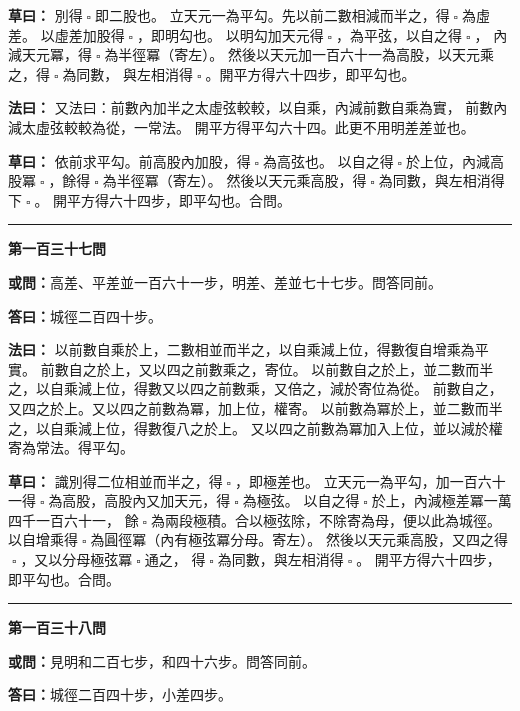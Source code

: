 \documentclass[11pt,a4paper]{article}
\let\origsquare\square
\renewcommand{\square}{\ensuremath{\origsquare}}%
\newcommand{\longline}{\noindent\rule{\textwidth}{0.4pt}}
\newcommand{\owen}[1]{%
  \par\vspace{0.4em}%
  \noindent\textcolor{problemcolor}{\textbf{或問：}}{\tradfont #1}\par\nopagebreak%
}
\newcommand{\fayue}[1]{%
  \par\noindent\textcolor{methodcolor}{\textbf{法曰：}}{\tradfont #1}\par\nopagebreak%
}
\newcommand{\tsaoyue}[1]{%
  \par\noindent\textcolor{workcolor}{\textbf{草曰：}}{\tradfont #1}\par%
}
\newcommand{\dayue}[1]{%
  \par\noindent\textcolor{anscolor}{\textbf{答曰：}}{\tradfont #1}\par\nopagebreak%
}
\newcommand{\wen}[1]{\par\vspace{0.3em}\noindent\textcolor{problemcolor}{\textbf{第#1問}}\par}
\begin{document}
\tsaoyue{%
別得$ \; \square \; $即二股也。
立天元一為平勾。先以前二數相減而半之，得$ \; \square \; $為虛差。
以虛差加股得$ \; \square \; $，即明勾也。
以明勾加天元得$ \; \square \; $，為平弦，以自之得$ \; \square \; $，
內減天元冪，得$ \; \square \; $為半徑冪（寄左）。
然後以天元加一百六十一為高股，以天元乘之，得$ \; \square \; $為同數，
與左相消得$ \; \square \; $。開平方得六十四步，即平勾也。}

\fayue{%
又法曰：前數內加半之太虛弦較較，以自乘，內減前數自乘為實，
前數內減太虛弦較較為從，一常法。
開平方得平勾六十四。此更不用明差差並也。}

\tsaoyue{%
依前求平勾。前高股內加股，得$ \; \square \; $為高弦也。
以自之得$ \; \square \; $於上位，內減高股冪$ \; \square \; $，餘得$ \; \square \; $為半徑冪（寄左）。
然後以天元乘高股，得$ \; \square \; $為同數，與左相消得下$ \; \square \; $。
開平方得六十四步，即平勾也。合問。}

\vspace{0.5cm}
\begin{center}
\longline
\end{center}

\wen{一百三十七}
\owen{高差、平差並一百六十一步，明差、差並七十七步。問答同前。}
\dayue{城徑二百四十步。}

\fayue{%
以前數自乘於上，二數相並而半之，以自乘減上位，得數復自增乘為平實。
前數自之於上，又以四之前數乘之，寄位。
以前數自之於上，並二數而半之，以自乘減上位，得數又以四之前數乘，又倍之，減於寄位為從。
前數自之，又四之於上。又以四之前數為冪，加上位，權寄。
以前數為冪於上，並二數而半之，以自乘減上位，得數復八之於上。
又以四之前數為冪加入上位，並以減於權寄為常法。得平勾。}

\tsaoyue{%
識別得二位相並而半之，得$ \; \square \; $，即極差也。
立天元一為平勾，加一百六十一得$ \; \square \; $為高股，高股內又加天元，得$ \; \square \; $為極弦。
以自之得$ \; \square \; $於上，內減極差冪一萬四千一百六十一，
餘$ \; \square \; $為兩段極積。合以極弦除，不除寄為母，便以此為城徑。
以自增乘得$ \; \square \; $為圓徑冪（內有極弦冪分母。寄左）。
然後以天元乘高股，又四之得$ \; \square \; $，又以分母極弦冪$ \; \square \; $通之，
得$ \; \square \; $為同數，與左相消得$ \; \square \; $。
開平方得六十四步，即平勾也。合問。}

\vspace{0.5cm}
\begin{center}
\longline
\end{center}

\wen{一百三十八}
\owen{見明和二百七步，和四十六步。問答同前。}
\dayue{城徑二百四十步，小差四步。}
\end{document}
